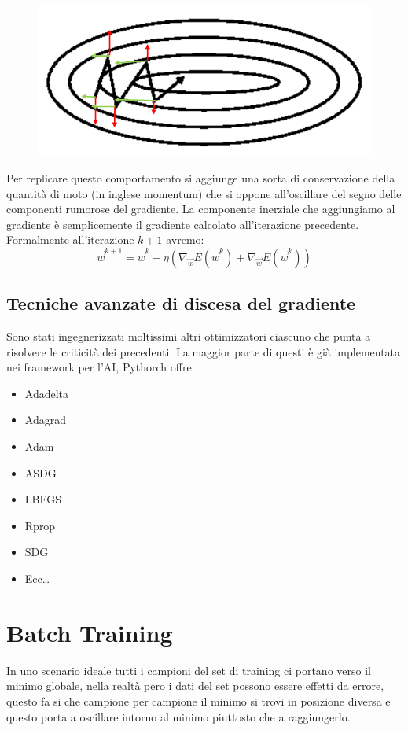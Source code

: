 \begin{figure}
	\vspace{-.25cm}
	\centering
	\includegraphics[width=\linewidth]{Picture/SGD_Momentum}
\end{figure}
Per replicare questo comportamento si aggiunge una sorta di conservazione della quantità di moto (in inglese momentum) che si oppone all'oscillare del segno delle componenti rumorose del gradiente. La componente inerziale che aggiungiamo al gradiente è semplicemente il gradiente calcolato all'iterazione precedente. Formalmente all'iterazione $k+1$ avremo:
\begin{equation}
	\vec{w}^{k+1} = \vec{w}^k - \eta (\nabla_{\vec{w}} E(\vec{w}^k) + \nabla_{\vec{w}} E(\vec{w}^k))
\end{equation}

\subsection{Tecniche avanzate di discesa del gradiente}
Sono stati ingegnerizzati moltissimi altri ottimizzatori ciascuno che punta a risolvere le criticità dei precedenti. La maggior parte di questi è già implementata nei framework per l'AI, Pythorch offre:
\begin{multicols}{4}
	\begin{itemize}
		\item Adadelta
		\item Adagrad
		\item Adam
		\item ASDG
		\item LBFGS
		\item Rprop
		\item SDG
		\item Ecc\dots
	\end{itemize}
\end{multicols}

\section{Batch Training}
In uno scenario ideale tutti i campioni del set di training ci portano verso il minimo globale, nella realtà pero i dati del set possono essere  effetti da errore, questo fa si che campione per campione il minimo si trovi in posizione diversa e questo porta a oscillare intorno al minimo piuttosto che a raggiungerlo.

